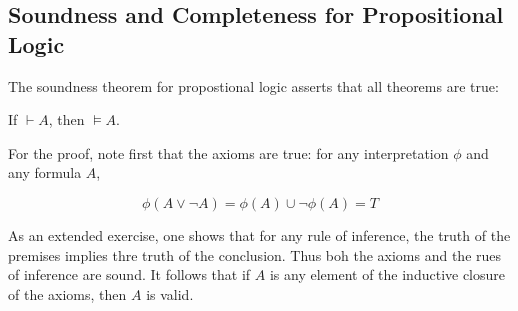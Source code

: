 \subsection{Soundness and Completeness for Propositional Logic}

The soundness theorem for propostional logic asserts that all theorems are true:

\begin{theorem}
If $\vdash A$, then $\models A$.
\end{theorem}

 For the proof, note first that the axioms are true: for any interpretation $\phi$ and any formula $A$,

$$\phi(A \lor \neg A) = \phi(A) \cup \neg \phi(A) = T$$

As an extended exercise, one shows that for any rule of inference, the truth of the premises implies thre truth of the conclusion.  Thus boh the axioms and the rues of inference are sound.  It follows that if $A$ is any element of the inductive closure of the axioms, then $A$ is valid.  
